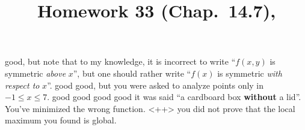\documentclass[pstricks,10pt,dvipsnames]{article} %
\title{Homework 33 (Chap.~14.7),
}
\begin{document}
\maketitle
{}
good, but note that to my knowledge, it is incorrect to write ``$f(x,y)$ is symmetric \textit{above} $x$'',
but one should rather write ``$f(x)$ is symmetric \textit{with respect to} $x$''.
good
good, but you were asked to analyze points only in $-1\le x\le7$.
good
good
good
good
it was said ``a cardboard box \textbf{without} a lid''. You've minimized the wrong function.
<++>
you did not prove that the local maximum you found is global.
\end{document}
